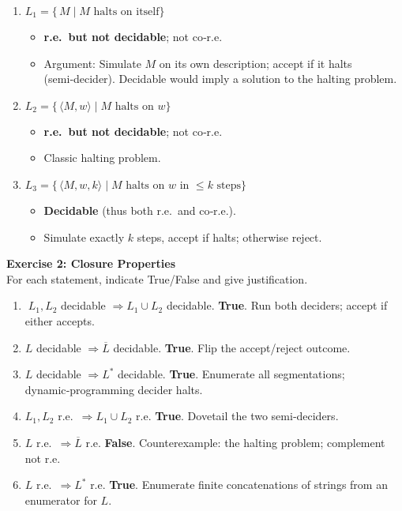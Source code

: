 \documentclass{article}
\theoremstyle{theorem}
\theoremstyle{definition}
\theoremstyle{remark}
\begin{document}
\begin{enumerate}
  \item \(L_1 = \{\,M \mid M \text{ halts on itself}\}\)  
        \begin{itemize}
          \item \textbf{r.e.\ but not decidable}; not co‑r.e.  
          \item Argument: Simulate \(M\) on its own description; accept if it halts (semi‑decider).  
                Decidable would imply a solution to the halting problem.
        \end{itemize}

  \item \(L_2 = \{\,\langle M,w\rangle \mid M \text{ halts on } w\}\)  
        \begin{itemize}
          \item \textbf{r.e.\ but not decidable}; not co‑r.e.  
          \item Classic halting problem.
        \end{itemize}

  \item \(L_3 = \{\,\langle M,w,k\rangle \mid M \text{ halts on } w \text{ in } \le k \text{ steps}\}\)  
        \begin{itemize}
          \item \textbf{Decidable} (thus both r.e.\ and co‑r.e.).  
          \item Simulate exactly \(k\) steps, accept if halts; otherwise reject.
        \end{itemize}

        
\end{enumerate}

\bigskip
\textbf{Exercise 2: Closure Properties}\\
For each statement, indicate True/False and give justification.

\begin{enumerate}
  \item \(\;L_1, L_2\) decidable \(\Rightarrow L_1 \cup L_2\) decidable. \textbf{True}.  
        Run both deciders; accept if either accepts.

  \item \(L\) decidable \(\Rightarrow \overline{L}\) decidable. \textbf{True}.  
        Flip the accept/reject outcome.

  \item \(L\) decidable \(\Rightarrow L^{*}\) decidable. \textbf{True}.  
        Enumerate all segmentations; dynamic‑programming decider halts.

  \item \(L_1, L_2\) r.e.\ \(\Rightarrow L_1 \cup L_2\) r.e. \textbf{True}.  
        Dovetail the two semi‑deciders.

  \item \(L\) r.e.\ \(\Rightarrow \overline{L}\) r.e. \textbf{False}.  
        Counterexample: the halting problem; complement not r.e.

  \item \(L\) r.e.\ \(\Rightarrow L^{*}\) r.e. \textbf{True}.  
        Enumerate finite concatenations of strings from an enumerator for \(L\).
\end{enumerate}
\end{document}
